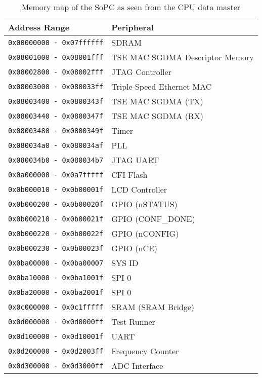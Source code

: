 \begin{table}[h!]
\centering
\begin{tabular}{ | l | l | }
 \hline
   Address Range           & Peripheral\\
 \hline
   \texttt{0x00000000 - 0x07ffffff} & SDRAM \\
 \hline
   \texttt{0x08001000 - 0x08001fff} & TSE MAC SGDMA Descriptor Memory \\
 \hline
   \texttt{0x08002800 - 0x08002fff} & JTAG Controller \\
 \hline
   \texttt{0x08003000 - 0x080033ff} & Triple-Speed Ethernet MAC \\
 \hline
   \texttt{0x08003400 - 0x0800343f} & TSE MAC SGDMA (TX) \\
 \hline
   \texttt{0x08003440 - 0x0800347f} & TSE MAC SGDMA (RX) \\
 \hline
   \texttt{0x08003480 - 0x0800349f} & Timer \\
 \hline
   \texttt{0x080034a0 - 0x080034af} & PLL \\
 \hline
   \texttt{0x080034b0 - 0x080034b7} & JTAG UART \\
 \hline
   \texttt{0x0a000000 - 0x0a7fffff} & CFI Flash \\
 \hline
   \texttt{0x0b000010 - 0x0b00001f} & LCD Controller \\
 \hline
   \texttt{0x0b000200 - 0x0b00020f} & GPIO (nSTATUS) \\
 \hline
   \texttt{0x0b000210 - 0x0b00021f} & GPIO (CONF\_DONE) \\
 \hline
   \texttt{0x0b000220 - 0x0b00022f} & GPIO (nCONFIG) \\
 \hline
   \texttt{0x0b000230 - 0x0b00023f} & GPIO (nCE) \\
 \hline
   \texttt{0x0ba00000 - 0x0ba00007} & SYS ID \\
 \hline
   \texttt{0x0ba10000 - 0x0ba1001f} & SPI 0 \\
 \hline
   \texttt{0x0ba20000 - 0x0ba2001f} & SPI 0 \\
 \hline
   \texttt{0x0c000000 - 0x0c1fffff} & SRAM (SRAM Bridge) \\
 \hline
   \texttt{0x0d000000 - 0x0d0000ff} & Test Runner \\
 \hline
   \texttt{0x0d100000 - 0x0d10001f} & UART \\
 \hline
   \texttt{0x0d200000 - 0x0d2003ff} & Frequency Counter \\
 \hline
   \texttt{0x0d300000 - 0x0d3000ff} & ADC Interface \\
 \hline
\end{tabular}
\caption{Memory map of the SoPC as seen from the CPU data master}
\label{table:memorymap_cpu}
\end{table}


